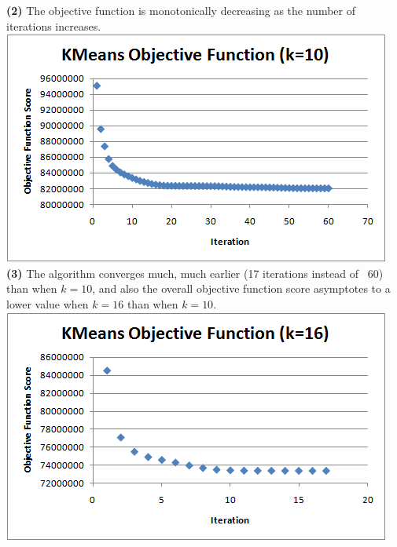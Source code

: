\documentclass[11pt]{article}
\renewcommand{\part}[1] {\vspace{.10in} {\bf (#1)}}
\begin{document}
\part{2}
The objective function is monotonically decreasing as the number of iterations increases.\\
\includegraphics{q4b.png}\\

\part{3}
The algorithm converges much, much earlier (17 iterations instead of ~60) than when $k=10$, and also the overall objective function score asymptotes to a lower value when $k=16$ than when $k=10$.\\
\includegraphics{q4c.png}\\
\end{document}
